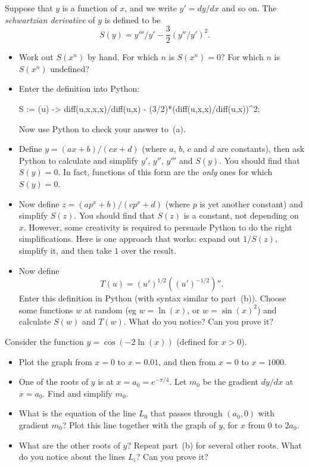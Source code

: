 \documentclass[a4paper,10pt]{amsbook}
\begin{document}
\begin{exercise}\label{ex-schwartzian}
 Suppose that $y$ is a function of $x$, and we write $y'=dy/dx$ and so
 on.  The \emph{schwartzian derivative} of $y$ is defined to be
 \[ S(y) = y'''/y' - \frac{3}{2}(y''/y')^2. \]
 \begin{itemize}
  \item[(a)] Work out $S(x^n)$ by hand.  For which $n$ is $S(x^n)=0$? 
   For which $n$ is $S(x^n)$ undefined? 
  \item[(b)] Enter the definition into Python:
\begin{pcodeblock}
  S := (u) -> diff(u,x,x,x)/diff(u,x) - (3/2)*(diff(u,x,x)/diff(u,x))^2;
\end{pcodeblock}
   Now use Python to check your answer to~(a). 
  \item[(c)] Define $y=(ax+b)/(cx+d)$ (where $a$, $b$, $c$ and $d$ are
   constants), then ask Python to calculate and simplify $y'$, $y''$,
   $y'''$ and $S(y)$.  You should find that $S(y)=0$.  In fact,
   functions of this form are the \emph{only} ones for which $S(y)=0$. 
  \item[(d)] Now define $z=(ap^x+b)/(cp^x+d)$ (where $p$ is yet
   another constant) and simplify $S(z)$.  You should find that $S(z)$
   is a constant, not depending on $x$.  However, some creativity is
   required to persuade Python to do the right simplifications.  Here
   is one approach that works: expand out $1/S(z)$, simplify it, and
   then take $1$ over the result. 
  \item[(e)] Now define 
   \[ T(u) = (u')^{1/2} ((u')^{-1/2})''. \] Enter this
   definition in Python (with syntax similar to part~(b)). 
   Choose some functions $w$ at random (eg $w=\ln(x)$, or
   $w=\sin(x)^2$) and calculate $S(w)$ and $T(w)$.  What do
   you notice?  Can you prove it? 
 \end{itemize}
\end{exercise}

\begin{exercise}
 Consider the function $y=\cos(-2\ln(x))$ (defined for $x>0$).
 \begin{itemize}
  \item[(a)] Plot the graph from $x=0$ to $x=0.01$, and then from
   $x=0$ to $x=1000$.
  \item[(b)] One of the roots of $y$ is at $x=a_0=e^{-\pi/4}$.  Let
   $m_0$ be the gradient $dy/dx$ at $x=a_0$.  Find and simplify
   $m_0$.  
  \item[(c)] What is the equation of the line $L_0$ that passes
   through $(a_0,0)$ with gradient $m_0$?  Plot this line together
   with the graph of $y$, for $x$ from $0$ to $2a_0$.
  \item[(c)] What are the other roots of $y$?  Repeat part~(b) for
   several other roots.  What do you notice about the lines $L_i$?
   Can you prove it?
 \end{itemize}
\end{exercise}
\end{document}
